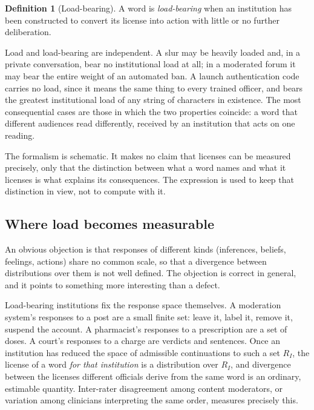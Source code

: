 \documentclass[11pt,a4paper]{article}
\theoremstyle{plain}
\theoremstyle{definition}
\newtheorem{definition}{Definition}
\theoremstyle{remark}
\begin{document}
\begin{definition}[Load-bearing]
A word is \emph{load-bearing} when an institution has been constructed to convert its license into action with little or no further deliberation.
\end{definition}

Load and load-bearing are independent. A slur may be heavily loaded and, in a private conversation, bear no institutional load at all; in a moderated forum it may bear the entire weight of an automated ban. A launch authentication code carries no load, since it means the same thing to every trained officer, and bears the greatest institutional load of any string of characters in existence. The most consequential cases are those in which the two properties coincide: a word that different audiences read differently, received by an institution that acts on one reading.

\begin{caution}
The formalism is schematic. It makes no claim that licenses can be measured precisely, only that the distinction between what a word names and what it licenses is what explains its consequences. The expression is used to keep that distinction in view, not to compute with it.
\end{caution}

\subsection{Where load becomes measurable}

An obvious objection is that responses of different kinds (inferences, beliefs, feelings, actions) share no common scale, so that a divergence between distributions over them is not well defined. The objection is correct in general, and it points to something more interesting than a defect.

Load-bearing institutions fix the response space themselves. A moderation system's responses to a post are a small finite set: leave it, label it, remove it, suspend the account. A pharmacist's responses to a prescription are a set of doses. A court's responses to a charge are verdicts and sentences. Once an institution has reduced the space of admissible continuations to such a set $R_I$, the license of a word \emph{for that institution} is a distribution over $R_I$, and divergence between the licenses different officials derive from the same word is an ordinary, estimable quantity. Inter-rater disagreement among content moderators, or variation among clinicians interpreting the same order, measures precisely this.
\end{document}

